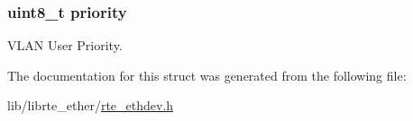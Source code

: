\subsubsection[{priority}]{\setlength{\rightskip}{0pt plus 5cm}uint8\+\_\+t priority}\label{structrte__eth__pfc__conf_a0ad043071ccc7a261d79a759dc9c6f0c}
V\+L\+A\+N User Priority. 

The documentation for this struct was generated from the following file\+:\begin{DoxyCompactItemize}
\item 
lib/librte\+\_\+ether/\hyperlink{rte__ethdev_8h}{rte\+\_\+ethdev.\+h}\end{DoxyCompactItemize}
